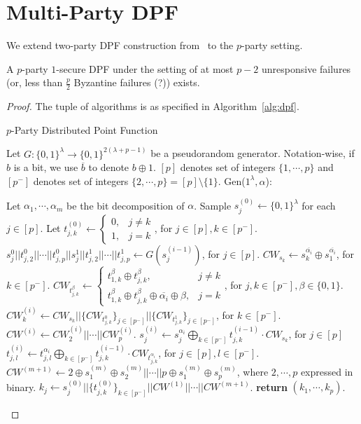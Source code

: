 \documentclass[11pt]{article}
\newcommand{\Gen}{\textsf{Gen}}
\begin{document}
\section{Multi-Party DPF}
We extend two-party DPF construction from~\cite{bgi18} to the $p$-party setting.
\begin{theorem}
A $p$-party $1$-secure DPF under the setting of at most $p-2$ unresponsive failures (or, less than $\frac{p}{2}$ Byzantine failures (?)) exists.
\end{theorem}
\begin{proof}
The tuple of algorithms is as specified in Algorithm~\ref{alg:dpf}. 

\begin{algorithm}
\caption{$p$-Party Distributed Point Function}\label{alg:dpf}
Let $G : \{0,1\}^\lambda \to \{0,1\}^{2(\lambda + p - 1)}$ be a pseudorandom generator. Notation-wise, if $b$ is a bit, we use $\overline{b}$ to denote $b \oplus 1$. $[p]$ denotes set of integers $\{1, \cdots, p\}$ and $[p^-]$ denotes set of integers $\{2, \cdots, p\} = [p] \setminus \{1\}$.
\vspace{10px}
\newline
\Gen($1^\lambda, \alpha$):
\begin{algorithmic}[1]
\State Let $\alpha_1, \cdots, \alpha_m$ be the bit decomposition of $\alpha$.
\State Sample $s_j^{(0)} \leftarrow \{0,1\}^{\lambda}$ for each $j \in [p]$.
\State Let $t_{j,k}^{(0)} \leftarrow \begin{cases} 0, & j \neq k\\ 1, & j = k\end{cases}$, for $j \in [p], k \in [p^-]$.
\State $s_j^0||t_{j,2}^0||\cdots||t_{j,p}^0||s_j^{1}||t_{j,2}^1||\cdots||t_{j,p}^1 \leftarrow G(s_j^{(i-1)})$, for $j \in [p]$.
\State $CW_{s_k} \leftarrow s_k^{\overline{\alpha_i}} \oplus s_1^{\overline{\alpha_i}}$, for $k \in [p^-]$.
\State $CW_{t_{j,k}^\beta} \leftarrow \begin{cases} t_{1,k}^\beta \oplus t_{j,k}^\beta, & j \neq k \\ t^\beta_{1,k} \oplus t^\beta_{j,k} \oplus \overline{\alpha_i} \oplus \beta, & j = k\end{cases}$, for $j,k \in [p^-], \beta \in \{0,1\}$.
\State $CW^{(i)}_k \leftarrow CW_{s_k}||\{CW_{t_{j,k}^0}\}_{j \in [p^-]}||\{CW_{t_{j,k}^1}\}_{j \in [p^-]}$, for $k \in [p^-]$.
\State $CW^{(i)} \leftarrow CW_2^{(i)} || \cdots || CW_p^{(i)}$.
\State $s_j^{(i)} \leftarrow s_j^{\alpha_i} \bigoplus_{k \in [p^-]} t_{j,k}^{(i-1)} \cdot CW_{s_k}$, for $j \in [p]$
\State $t_{j,l}^{(i)} \leftarrow t_{j,l}^{\alpha_i} \bigoplus_{k \in [p^-]} t_{j,k}^{(i-1)} \cdot CW_{t_{j,k}^{\alpha_i}}$, for $j \in [p], l \in [p^-]$.
\EndFor
\State $CW^{(m+1)} \leftarrow 2 \oplus s_1^{(m)} \oplus s_2^{(m)} || \cdots || p \oplus s_1^{(m)} \oplus s_p^{(m)}$, where $2, \cdots, p$ expressed in binary.
\State $k_j \leftarrow s_j^{(0)}||\{t_{j,k}^{(0)}\}_{k \in [p^-]}||CW^{(1)}||\cdots||CW^{(m+1)}$.
\State \textbf{return} $(k_1, \cdots, k_p)$.
\end{algorithmic}


\end{algorithm}
\end{proof}
\end{document}
